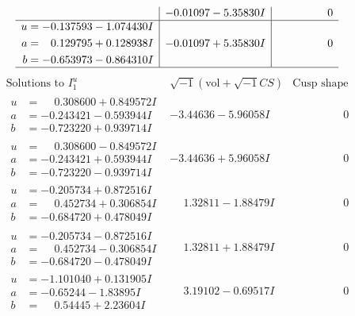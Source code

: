 \documentclass[1p]{elsarticle_modified}
\theoremstyle{definition}
\newcommand{\I}{\sqrt{-1}}
\begin{document}
$$\begin{array}{c|c|c}
 & -0.01097 - 5.35830 I & \phantom{-0.000000 } 0 \\ \hline\begin{aligned}
u &= -0.137593 - 1.074430 I \\
a &= \phantom{-}0.129795 + 0.128938 I \\
b &= -0.653973 - 0.864310 I\end{aligned}
 & -0.01097 + 5.35830 I & \phantom{-0.000000 } 0\\
 \hline 
 \end{array}$$\newpage$$\begin{array}{c|c|c}  
\text{Solutions to }I^u_{1}& \I (\text{vol} + \sqrt{-1}CS) & \text{Cusp shape}\\
 \hline 
\begin{aligned}
u &= \phantom{-}0.308600 + 0.849572 I \\
a &= -0.243421 - 0.593944 I \\
b &= -0.723220 + 0.939714 I\end{aligned}
 & -3.44636 - 5.96058 I & \phantom{-0.000000 } 0 \\ \hline\begin{aligned}
u &= \phantom{-}0.308600 - 0.849572 I \\
a &= -0.243421 + 0.593944 I \\
b &= -0.723220 - 0.939714 I\end{aligned}
 & -3.44636 + 5.96058 I & \phantom{-0.000000 } 0 \\ \hline\begin{aligned}
u &= -0.205734 + 0.872516 I \\
a &= \phantom{-}0.452734 + 0.306854 I \\
b &= -0.684720 + 0.478049 I\end{aligned}
 & \phantom{-}1.32811 - 1.88479 I & \phantom{-0.000000 } 0 \\ \hline\begin{aligned}
u &= -0.205734 - 0.872516 I \\
a &= \phantom{-}0.452734 - 0.306854 I \\
b &= -0.684720 - 0.478049 I\end{aligned}
 & \phantom{-}1.32811 + 1.88479 I & \phantom{-0.000000 } 0 \\ \hline\begin{aligned}
u &= -1.101040 + 0.131905 I \\
a &= -0.65244 - 1.83895 I \\
b &= \phantom{-}0.54445 + 2.23604 I\end{aligned}
 & \phantom{-}3.19102 - 0.69517 I & \phantom{-0.000000 } 0 \\ \hline\begin{aligned}

\end{aligned}
\end{array}$$
\end{document}
